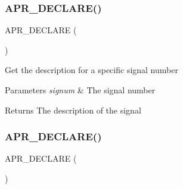 \subsubsection{\texorpdfstring{A\+P\+R\+\_\+\+D\+E\+C\+L\+A\+R\+E()}{APR\_DECLARE()}\hspace{0.1cm}{\footnotesize\ttfamily [1/2]}}
{\footnotesize\ttfamily A\+P\+R\+\_\+\+D\+E\+C\+L\+A\+RE (\begin{DoxyParamCaption}\item[{const char $\ast$}]{ }\end{DoxyParamCaption})}

Get the description for a specific signal number 
\begin{DoxyParams}{Parameters}
{\em signum} & The signal number \\
\hline
\end{DoxyParams}
\begin{DoxyReturn}{Returns}
The description of the signal 
\end{DoxyReturn}
\mbox{\label{group__apr__signal_ga907565140ae0dda6f562a679e6519e67}} 
\subsubsection{\texorpdfstring{A\+P\+R\+\_\+\+D\+E\+C\+L\+A\+R\+E()}{APR\_DECLARE()}\hspace{0.1cm}{\footnotesize\ttfamily [2/2]}}
{\footnotesize\ttfamily A\+P\+R\+\_\+\+D\+E\+C\+L\+A\+RE (\begin{DoxyParamCaption}\item[{\mbox{\hyperlink{group__apr__errno_gaf76ee4543247e9fb3f3546203e590a6c}{apr\+\_\+status\+\_\+t}}}]{ }\end{DoxyParamCaption})}

